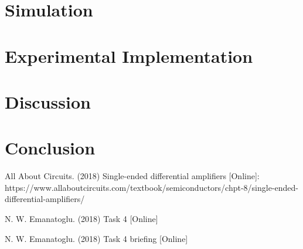 \documentclass{article}
\begin{document}
  \section{Simulation}
    
    

     
 
    
  \section{Experimental Implementation}
    
    
  \section{Discussion}
     
    
    
    \section{Conclusion}
        

    



\clearpage

\appendix

\begin{thebibliography}{00}

 All About Circuits. (2018) Single-ended differential amplifiers [Online]: https://www.allaboutcircuits.com/textbook/semiconductors/chpt-8/single-ended-differential-amplifiers/

 N. W. Emanatoglu. (2018) Task 4 [Online]

 N. W. Emanatoglu. (2018) Task 4 briefing [Online]
 

\end{thebibliography}
\end{document}
